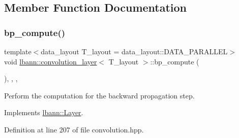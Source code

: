 \subsection{Member Function Documentation}
\mbox{\label{classlbann_1_1convolution__layer_a610f24f98b548434cd4d22419f47c7f0}} 
\subsubsection{\texorpdfstring{bp\+\_\+compute()}{bp\_compute()}}
{\footnotesize\ttfamily template$<$data\+\_\+layout T\+\_\+layout = data\+\_\+layout\+::\+D\+A\+T\+A\+\_\+\+P\+A\+R\+A\+L\+L\+EL$>$ \\
void \hyperlink{classlbann_1_1convolution__layer}{lbann\+::convolution\+\_\+layer}$<$ T\+\_\+layout $>$\+::bp\+\_\+compute (\begin{DoxyParamCaption}{ }\end{DoxyParamCaption})\hspace{0.3cm}{\ttfamily [inline]}, {\ttfamily [override]}, {\ttfamily [protected]}, {\ttfamily [virtual]}}

Perform the computation for the backward propagation step. 

Implements \hyperlink{classlbann_1_1Layer_a7442e01f9ee1294df2de811efcf5171e}{lbann\+::\+Layer}.



Definition at line 207 of file convolution.\+hpp.


